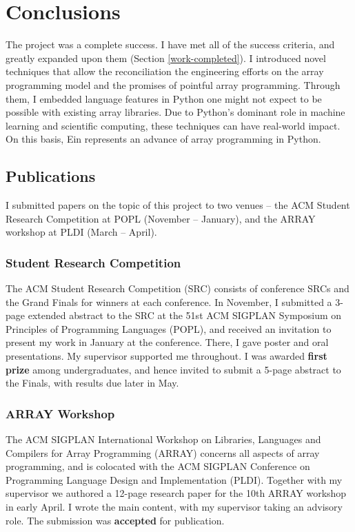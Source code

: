 \chapter{Conclusions}

The project was a complete success. 
I have met all of the success criteria, and greatly expanded upon them (Section \ref{work-completed}). 
I introduced novel techniques that allow the reconciliation the engineering efforts on the array programming model and the promises of pointful array programming. 
Through them, I embedded language features in Python one might not expect to be possible with existing array libraries. 
Due to Python's dominant role in machine learning and scientific computing, these techniques can have real-world impact. 
On this basis, Ein represents an advance of array programming in Python.

\section{Publications}
\label{publications}

I submitted papers on the topic of this project to two venues -- the ACM Student Research Competition at POPL (November -- January), and the ARRAY workshop at PLDI (March -- April).

\subsection{Student Research Competition}

The ACM Student Research Competition (SRC) consists of conference SRCs and the Grand Finals for winners at each conference. In November, I submitted a 3-page extended abstract to the SRC at the 51st ACM SIGPLAN Symposium on Principles of Programming Languages (POPL), and received an invitation to present my work in January at the conference. 
There, I gave poster and oral presentations.
My supervisor supported me throughout.
I was awarded \textbf{first prize} among undergraduates, and hence invited to submit a 5-page abstract to the Finals, with results due later in May.

\subsection{ARRAY Workshop}

The ACM SIGPLAN International Workshop on Libraries, Languages and Compilers for Array Programming (ARRAY) concerns all aspects of array programming, and is colocated with the ACM SIGPLAN Conference on Programming Language Design and Implementation (PLDI). 
Together with my supervisor we authored a 12-page research paper for the 10th ARRAY workshop in early April. 
I wrote the main content, with my supervisor taking an advisory role. 
The submission was \textbf{accepted} for publication.

